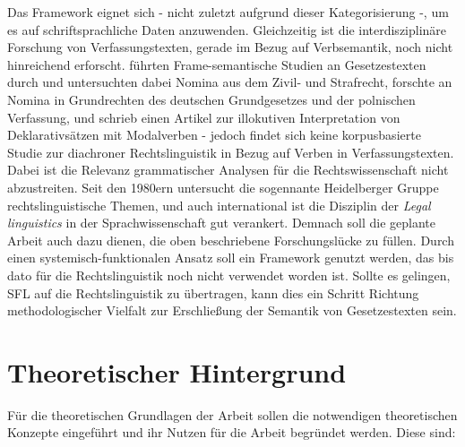 Das Framework eignet sich - nicht zuletzt aufgrund dieser Kategorisierung -, um es auf schriftsprachliche Daten anzuwenden. Gleichzeitig ist die interdisziplinäre Forschung von Verfassungstexten, gerade im Bezug auf Verbsemantik, noch nicht hinreichend erforscht. \cite{Busse2015,BusseEtAl2018} führten Frame-semantische Studien an Gesetzestexten durch und untersuchten dabei Nomina aus dem Zivil- und Strafrecht, \cite{Cirko2022} forschte an Nomina in Grundrechten des deutschen Grundgesetzes und der polnischen Verfassung, und \cite{Sayatz1991} schrieb einen Artikel zur illokutiven Interpretation von Deklarativsätzen mit Modalverben - jedoch findet sich keine korpusbasierte Studie zur diachroner Rechtslinguistik in Bezug auf Verben in Verfassungstexten. Dabei ist die Relevanz grammatischer Analysen für die Rechtswissenschaft nicht abzustreiten. Seit den 1980ern untersucht die sogennante Heidelberger Gruppe rechtslinguistische Themen, und auch international ist die Disziplin der \textit{Legal linguistics} in der Sprachwissenschaft gut verankert. Demnach soll die geplante Arbeit auch dazu dienen, die oben beschriebene Forschungslücke zu füllen. Durch einen systemisch-funktionalen Ansatz soll ein Framework genutzt werden, das bis dato für die Rechtslinguistik noch nicht verwendet worden ist. Sollte es gelingen, SFL auf die Rechtslinguistik zu übertragen, kann dies ein Schritt Richtung methodologischer Vielfalt zur Erschließung der Semantik von Gesetzestexten sein.






\section{Theoretischer Hintergrund}\label{sec:theory}

Für die theoretischen Grundlagen der Arbeit sollen die notwendigen theoretischen Konzepte eingeführt und ihr Nutzen für die Arbeit begründet werden. Diese sind:

